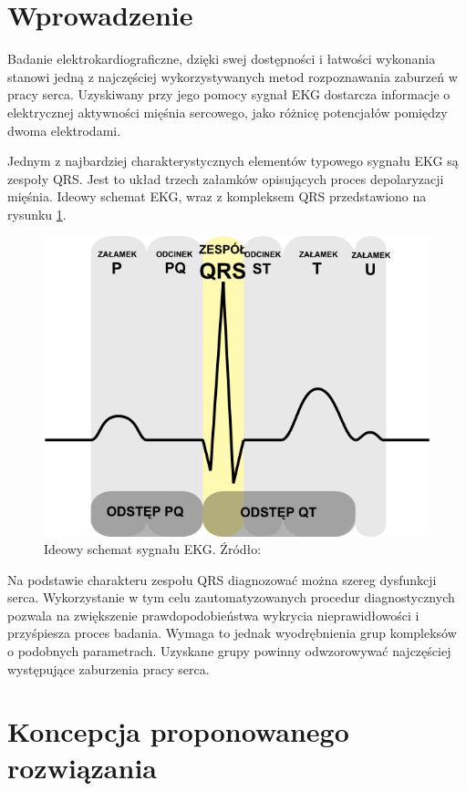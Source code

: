 \section{Wprowadzenie}
Badanie elektrokardiograficzne, dzięki swej dostępności i łatwości wykonania stanowi jedną z najczęściej wykorzystywanych metod rozpoznawania zaburzeń w pracy serca. Uzyskiwany przy jego pomocy sygnał EKG dostarcza informacje o elektrycznej aktywności mięśnia sercowego, jako różnicę potencjałów pomiędzy dwoma elektrodami.

Jednym z najbardziej charakterystycznych elementów typowego sygnału EKG są zespoły QRS. Jest to układ trzech załamków opisujących proces depolaryzacji mięśnia. Ideowy schemat EKG, wraz z kompleksem QRS przedstawiono na rysunku \ref{fig:qrs-complex}.


\begin{figure}[H]
	\centering
	\includegraphics[width=12cm]{img/qrs-complex}
	\caption{Ideowy schemat sygnału EKG. Źródło: \cite{qrs-wiki}}
	\label{fig:qrs-complex}
\end{figure}

Na podstawie charakteru zespołu QRS diagnozować można szereg dysfunkcji serca. Wykorzystanie w tym celu zautomatyzowanych procedur diagnostycznych pozwala na zwiększenie prawdopodobieństwa wykrycia nieprawidłowości i przyśpiesza proces badania. Wymaga to jednak wyodrębnienia grup kompleksów o podobnych parametrach. Uzyskane grupy powinny odwzorowywać najczęściej występujące zaburzenia pracy serca.

\section{Koncepcja proponowanego rozwiązania}

